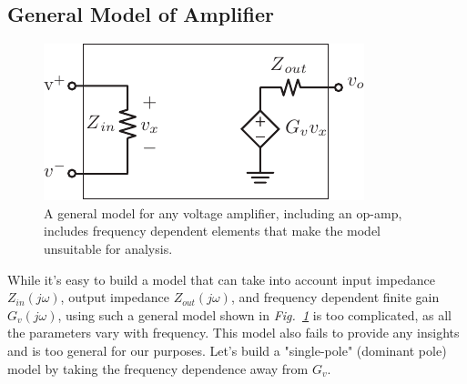 \subsection{General Model of Amplifier}
\begin{figure}[tb]
\centering
\includegraphics[scale=1]{vampmodelz}
\caption{A general model for any voltage amplifier, including an op-amp, includes frequency dependent elements that make the model unsuitable for analysis.}
\label{fig:vampmodelz}
\end{figure}
While it's easy to build a model that can take into account input impedance $Z_{in}(j\omega)$, output impedance $Z_{out}(j\omega)$, and frequency dependent finite gain $G_v(j\omega)$, using such a general model shown in \emph{Fig.~\ref{fig:vampmodelz}} is too complicated, as all the parameters vary with frequency.  This model also fails to provide any insights and is too general for our purposes.  Let's build a "single-pole" (dominant pole) model by taking the frequency dependence away from $G_v$.

